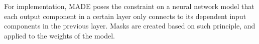 \documentclass[mathfont=newtx]{uai2023} %
\begin{document}
For implementation, MADE poses the constraint on a neural network model that each output component in a certain layer only connects to its dependent input components in the previous layer. Masks are created based on such principle, and applied to the weights of the model.
 
\end{document}
